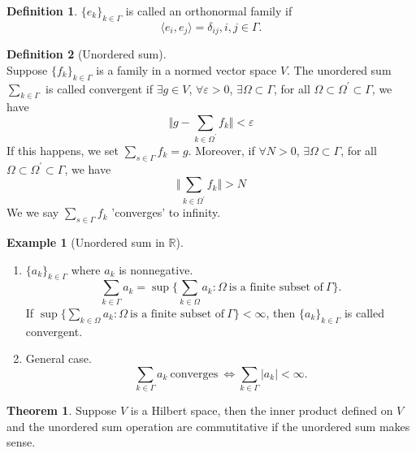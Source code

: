 \documentclass[12pt]{book}
\theoremstyle{definition}
\newtheorem{definition}{Definition}[chapter]
\newtheorem{example}{Example}[chapter]
\newtheorem{theorem}{Theorem}[chapter]
\newcommand{\inner}[2]{{\langle #1,#2\rangle}}
\newcommand{\R}{\mathbb{R}}
\begin{document}
\begin{definition}
	$\{e_k\}_{k \in \Gamma}$ is called an orthonormal family if 
$$
\inner{e_i}{e_j}=\delta_{ij}, i,j \in \Gamma.
$$
\end{definition}
\begin{definition}[Unordered sum] \ \\
	Suppose $\{f_k\}_{k \in \Gamma}$ is a family in a normed vector space $V$. The unordered sum $\sum_{k \in \Gamma}$ is called convergent if $\exists g \in V$, $\forall \varepsilon >0$, $\exists \Omega \subset \Gamma$, for all $\Omega \subset \Omega^\prime \subset \Gamma$, we have
	$$
	\Vert g - \sum_{k\in \Omega^\prime}f_k \Vert < \varepsilon
	$$
If this happens, we set $\sum_{s\in \Gamma}f_k = g$. Moreover, if $\forall N >0$, $\exists \Omega \subset \Gamma$, for all $\Omega \subset \Omega^\prime \subset \Gamma$, we have
$$
\Vert \sum_{k\in \Omega^\prime}f_k \Vert > N
$$
We we say $\sum_{s\in \Gamma}f_k$ 'converges' to infinity.
\end{definition}

\begin{example}[Unordered sum in $\R$]\ 
	\begin{enumerate}
		\item $\{a_k\}_{k \in \Gamma}$ where $a_k$ is nonnegative.
$$
\sum_{k \in \Gamma}a_k = \sup\{\sum_{k \in \Omega}a_k: \Omega \ \text{is a finite subset of} \ \Gamma \}.
$$
If $\sup\{\sum_{k \in \Omega}a_k: \Omega \ \text{is a finite subset of} \ \Gamma \} < \infty$, then $\{a_k\}_{k \in \Gamma}$ is called convergent.
		\item General case.
$$
\sum_{k \in \Gamma}a_k \ \text{converges} \ \iff \sum_{k \in \Gamma}|a_k| < \infty.
$$
	\end{enumerate}
\end{example}

\begin{theorem}
Suppose $V$ is a Hilbert space, then the inner product defined on $V$ and the unordered sum operation are commutitative if the unordered sum makes sense.
\end{theorem}
\end{document}
